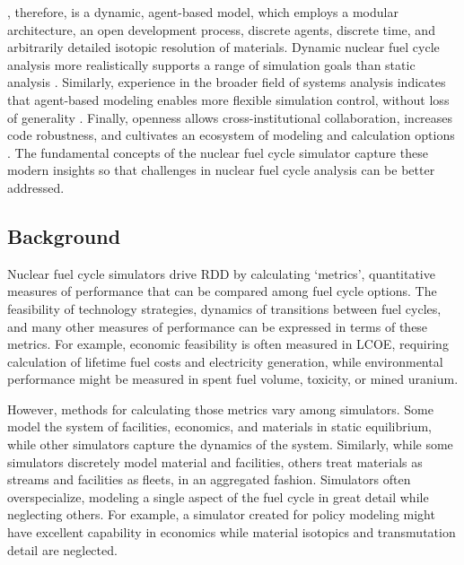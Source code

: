 \Cyclus, therefore, is a dynamic, agent-based model, which employs a modular 
architecture, an open development process, discrete agents, discrete time, and 
arbitrarily detailed isotopic resolution of materials.  Dynamic nuclear fuel 
cycle analysis more realistically supports a range of simulation goals than 
static analysis 
\cite{piet_dynamic_2011}. Similarly, experience in the broader field of systems 
analysis indicates that agent-based modeling enables more flexible simulation 
control, without loss of generality \cite{macal_agent-based_2010}. Finally, openness 
allows cross-institutional collaboration, increases code robustness, and 
cultivates an ecosystem of modeling and calculation options 
\cite{softwarecarpentryresource}.  The fundamental concepts of the \Cyclus 
nuclear fuel cycle simulator capture these modern insights so that challenges 
in nuclear fuel cycle analysis can be better addressed. 

\subsection{Background}



Nuclear fuel cycle simulators drive \gls{RDD} by calculating `metrics', 
quantitative measures of performance that 
can be compared among fuel cycle options. The feasibility of technology 
strategies, dynamics of transitions between fuel cycles, and many other 
measures of performance can be expressed in terms of these metrics. For example, 
economic feasibility is often measured in \gls{LCOE}, requiring calculation of
lifetime fuel costs and electricity generation, 
while environmental performance might be measured in spent fuel volume, 
  toxicity, or mined uranium.

However, methods for calculating those metrics vary among simulators. Some model the 
system of facilities, economics, and materials in static equilibrium, while 
other simulators capture the dynamics of the system.  
Similarly, while some simulators discretely model material and facilities, 
others treat materials as streams and facilities as fleets, in an aggregated 
fashion. Simulators often overspecialize, 
modeling a single aspect of the fuel cycle in great detail while neglecting 
others. For example, a simulator created for policy modeling might have excellent 
capability in economics while material isotopics and transmutation detail are 
neglected.

